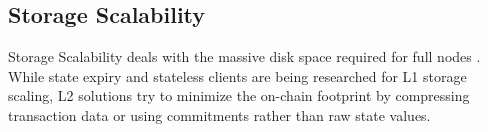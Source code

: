 \subsection{Storage Scalability}
Storage Scalability deals with the massive disk space required for full nodes \citep{sanka2021systematic}. While state expiry and stateless clients are being researched for L1 storage scaling, L2 solutions try to minimize the on-chain footprint by compressing transaction data or using commitments rather than raw state values.
